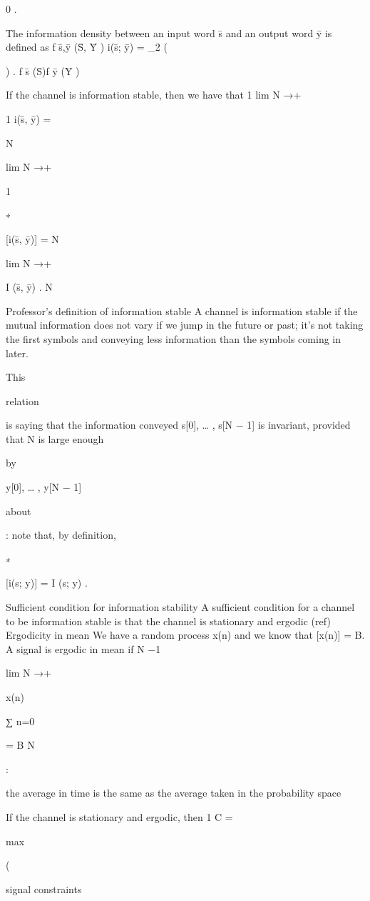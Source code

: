 {0 .

The information density between an input word s̄ and an output word ȳ is defined as f s̄,ȳ (S̄, Ȳ )
i(s̄; ȳ) = \log_2 (

) .
f s̄ (S̄)f ȳ (Ȳ )

If the channel is information stable, then we have that 1 lim N →+\infty

1 i(s̄, ȳ) =

N

lim N →+\infty

1

∗

[i(s̄, ȳ)] =
N

lim N →+\infty

I (s̄, ȳ) .
N

Professor's definition of information stable A channel is information stable if the mutual information does not vary if we jump in the future or past; it's not taking the first symbols and conveying less information than the symbols coming in later.

This

relation

is saying that the information conveyed s[0], … , s[N − 1] is invariant, provided that N is large enough

by

y[0], … , y[N − 1]

about

: note that, by definition,

∗

[i(s; y)] = I (s; y) .

​Sufficient condition for information stability A sufficient condition for a channel to be information stable is that the channel is stationary and ergodic (ref)
Ergodicity in mean We have a random process x(n) and we know that [x(n)] = B.
A signal is ergodic in mean if N −1

lim N →+\infty

x(n)

∑
n=0

= B N

:

the average in time is the same as the average taken in the probability space

If the channel is stationary and ergodic, then 1 C =

max

(

signal constraints

}
